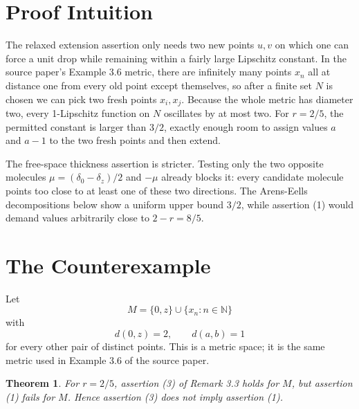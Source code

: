 \documentclass[11pt]{article}
\newtheorem{theorem}{Theorem}
\newcommand{\de}{\delta}
\begin{document}
\section*{Proof Intuition}

The relaxed extension assertion only needs two new points \(u,v\) on which
one can force a unit drop while remaining within a fairly large Lipschitz
constant. In the source paper's Example 3.6 metric, there are infinitely many
points \(x_n\) all at distance one from every old point except themselves, so
after a finite set \(N\) is chosen we can pick two fresh points \(x_i,x_j\).
Because the whole metric has diameter two, every 1-Lipschitz function on
\(N\) oscillates by at most two. For \(r=2/5\), the permitted constant is
larger than \(3/2\), exactly enough room to assign values \(a\) and \(a-1\)
to the two fresh points and then extend.

The free-space thickness assertion is stricter. Testing only the two opposite
molecules \(\mu=(\de_0-\de_z)/2\) and \(-\mu\) already blocks it: every
candidate molecule points too close to at least one of these two directions.
The Arens-Eells decompositions below show a uniform upper bound \(3/2\), while
assertion (1) would demand values arbitrarily close to \(2-r=8/5\).

\section*{The Counterexample}

Let
\[
 M=\{0,z\}\cup\{x_n:n\in\mathbb N\}
\]
with
\[
 d(0,z)=2,\qquad d(a,b)=1
\]
for every other pair of distinct points. This is a metric space; it is the
same metric used in Example 3.6 of the source paper.

\begin{theorem}
For \(r=2/5\), assertion (3) of Remark 3.3 holds for \(M\), but assertion
(1) fails for \(M\). Hence assertion (3) does not imply assertion (1).
\end{theorem}
\end{document}

